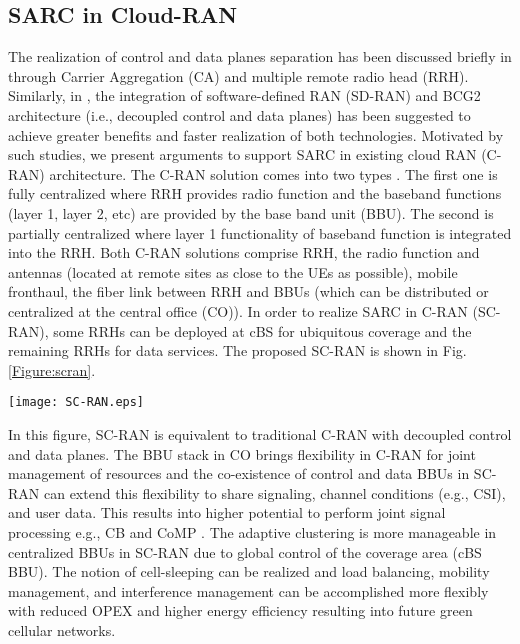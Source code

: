 \documentclass[article,10pt,twocolumn]{IEEEtran}
\begin{document}
\subsection{SARC in Cloud-RAN}\label{sec:cran}
The realization of control and data planes separation has been discussed briefly in \citep{6825019, R1-130566, 6704656} through Carrier Aggregation (CA) and multiple remote radio head (RRH). Similarly, in \citep{7047300}, the integration of software-defined RAN (SD-RAN) and BCG2 architecture (i.e., decoupled control and data planes) has been suggested to achieve greater benefits and faster realization of both technologies. Motivated by such studies, we present arguments to support SARC in existing cloud RAN (C-RAN) architecture. The C-RAN solution comes into two types \citep{CRAN}. The first one is fully centralized where RRH provides radio function and the baseband functions (layer 1, layer 2, etc) are provided by the base band unit (BBU). The second is partially centralized where layer 1 functionality of baseband function is integrated into the RRH. Both C-RAN solutions comprise RRH, the radio function and antennas (located at remote sites as close to the UEs as possible), mobile fronthaul, the fiber link between RRH and BBUs (which can be distributed or centralized at the central office (CO)). In order to realize SARC in C-RAN (SC-RAN), some RRHs can be deployed at cBS for ubiquitous coverage and the remaining RRHs for data services. The proposed SC-RAN is shown in Fig. \ref{Figure:scran}.
\begin{figure*}[!htb]
\centering
  \texttt{[image: SC-RAN.eps]}
  \caption{Split C-RAN Architecture}\label{Figure:scran}
\vspace{-5mm}
\end{figure*}

In this figure, SC-RAN is equivalent to traditional C-RAN with decoupled control and data planes. The BBU stack in CO brings flexibility in C-RAN for joint management of resources and the co-existence of control and data BBUs in SC-RAN can extend this flexibility to share signaling, channel conditions (e.g., CSI), and user data. This results into higher potential to perform joint signal processing e.g., CB and CoMP \citep{CRAN}. The adaptive clustering is more manageable in centralized BBUs in SC-RAN due to global control of the coverage area (cBS BBU). The notion of cell-sleeping can be realized and load balancing, mobility management, and interference management can be accomplished more flexibly with reduced OPEX and higher energy efficiency resulting into future green cellular networks.
\end{document}
